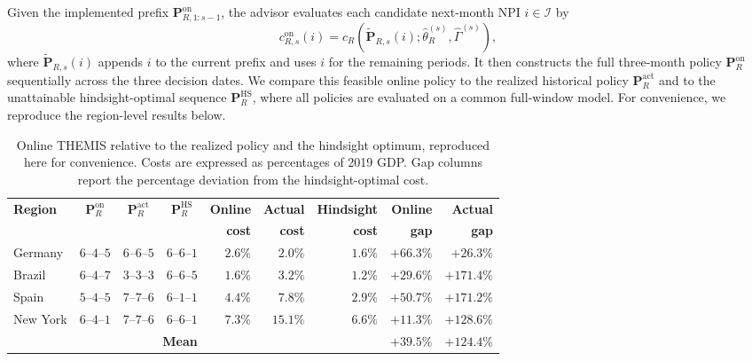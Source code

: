 \documentclass[letterpaper,twoside,11pt]{reviewresponse}
\begin{document}
Given the implemented prefix $\bm{P}_{R,1:s-1}^{\mathrm{on}}$, the advisor evaluates each candidate next-month NPI $i \in \mathcal{I}$ by
\[
c_{R,s}^{\mathrm{on}}(i)
=
c_R\!\left(\widetilde{\bm{P}}_{R,s}(i); \hat{\theta}_R^{(s)}, \hat{\Gamma}^{(s)}\right),
\]
where $\widetilde{\bm{P}}_{R,s}(i)$ appends $i$ to the current prefix and uses $i$ for the remaining periods. It then constructs the full three-month policy $\bm{P}_R^{\mathrm{on}}$ sequentially across the three decision dates. We compare this feasible online policy to the realized historical policy $\bm{P}_R^{\mathrm{act}}$ and to the unattainable hindsight-optimal sequence $\bm{P}_R^{\mathrm{HS}}$, where all policies are evaluated on a common full-window model. For convenience, we reproduce the region-level results below.

\begin{table}[h!]
\centering\footnotesize
\renewcommand{\arraystretch}{1.05}
\begin{tabular}{|l|c|c|c|r|r|r|r|r|}
\hline
\textbf{Region} & $\bm{P}_R^{\mathrm{on}}$ & $\bm{P}_R^{\mathrm{act}}$ & $\bm{P}_R^{\mathrm{HS}}$ & \textbf{Online} & \textbf{Actual} & \textbf{Hindsight} & \textbf{Online} & \textbf{Actual} \\
                &                          &                         &                     & \textbf{cost}   & \textbf{cost}   & \textbf{cost}      & \textbf{gap}    & \textbf{gap}   \\\hline
Germany   & $6$--$4$--$5$ & $6$--$6$--$5$ & $6$--$6$--$1$ & $2.6\%$  & $2.0\%$   & $1.6\%$  & $+66.3\%$ & $+26.3\%$ \\
Brazil    & $6$--$4$--$7$ & $3$--$3$--$3$ & $6$--$6$--$5$ & $1.6\%$   & $3.2\%$  & $1.2\%$  & $+29.6\%$ & $+171.4\%$ \\
Spain     & $5$--$4$--$5$ & $7$--$7$--$6$ & $6$--$1$--$1$ & $4.4\%$  & $7.8\%$  & $2.9\%$ & $+50.7\%$ & $+171.2\%$ \\
New York  & $6$--$4$--$1$ & $7$--$7$--$6$ & $6$--$6$--$1$ & $7.3\%$  & $15.1\%$  & $6.6\%$ & $+11.3\%$ & $+128.6\%$ \\\hline
\multicolumn{4}{|r|}{\textbf{Mean}} & & & & \textbf{$+39.5\%$} & \textbf{$+124.4\%$} \\\hline
\end{tabular}
\caption{Online THEMIS relative to the realized policy and the hindsight optimum, reproduced here for convenience. Costs are expressed as percentages of 2019 GDP. Gap columns report the percentage deviation from the hindsight-optimal cost.}
\end{table}
\end{document}
